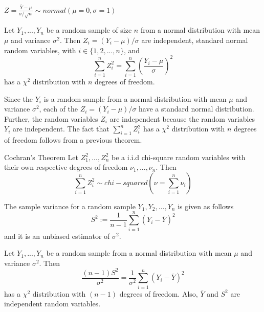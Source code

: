 \documentclass[12pt, a4paper, twoside, openright, titlepage]{book}
\begin{document}
\begin{cor}{}{}
    $Z = \frac{\overline{Y}-\mu}{\sigma/\sqrt{n}} \sim normal(\mu = 0, \sigma = 1)$
\end{cor}



\begin{thm}{}{}
    Let $Y_1,...,Y_n$ be a random sample of size $n$ from a normal distribution with mean $\mu$ and variance $\sigma^2$. Then $Z_i = (Y_i-\mu)/\sigma$ are independent, standard normal random variables, with $i \in \{1,2,...,n\}$, and \begin{equation*}
        \sum\limits_{i=1}^nZ_i^2 = \sum\limits_{i=1}^n\left(\frac{Y_i-\mu}{\sigma}\right)^2
    \end{equation*}
    has a $\chi^2$ distribution with $n$ degrees of freedom.
\end{thm}
\begin{proof*}{}{}
    Since the $Y_i$ is a random sample from a normal distribution with mean $\mu$ and variance $\sigma^2$, each of the $Z_i = (Y_i-\mu)/\sigma$ have a standard normal distribution. Further, the random variables $Z_i$ are independent because the random variables $Y_i$ are independent. The fact that $\sum_{i=1}^nZ_i^2$ has a $\chi^2$ distribution with $n$ degrees of freedom follows from a previous theorem.
\end{proof*}


\begin{thm}{Cochran's Theorem}{}
    Let $Z_1^2,...,Z_n^2$ be a i.i.d chi-square random variables with their own respective degrees of freedom $\nu_1,...,\nu_n$. Then \begin{equation*}
        \sum_{i=1}^nZ_i^2 \sim chi-squared(\nu = \sum_{i=1}^n\nu_i)
    \end{equation*}
\end{thm}



\begin{defn}{}{}
    The sample variance for a random sample $Y_1,Y_2,...,Y_n$ is given as follows \begin{equation*}
        S^2 := \frac{1}{n-1}\sum\limits_{i=1}^n(Y_i-\overline{Y})^2
    \end{equation*}
    and it is an unbiased estimator of $\sigma^2$.
\end{defn}

\begin{thm}{}{}
    Let $Y_1,...,Y_n$ be a random sample from a normal distribution with mean $\mu$ and variance $\sigma^2$. Then \begin{equation*}
        \frac{(n-1)S^2}{\sigma^2} = \frac{1}{\sigma^2}\sum\limits_{i=1}^n(Y_i-\overline{Y})^2
    \end{equation*}
    has a $\chi^2$ distribution with $(n-1)$ degrees of freedom. Also, $\overline{Y}$ and $S^2$ are independent random variables.
\end{thm}
\end{document}
